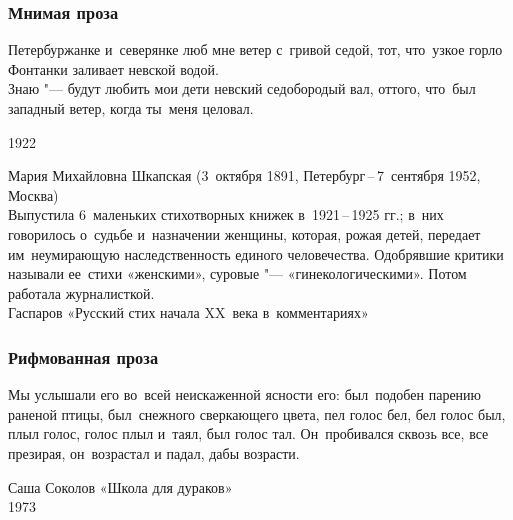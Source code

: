 \documentclass{beamer}
\begin{document}

\begin{frame}
\frametitle{Мнимая проза}
\begin{flushleft}
Петербуржанке и~северянке люб мне ветер с~гривой седой, тот, что~узкое горло Фонтанки заливает невской водой.\\
Знаю "--- будут любить мои дети невский седобородый вал, оттого, что~был западный ветер, когда ты~меня целовал.
\end{flushleft}

1922
\begin{flushleft}
\footnotesize{Мария Михайловна Шкапская
(3~октября 1891, Петербург\,--\,7~сентября 1952, Москва)\\
Выпустила 6~маленьких стихотворных книжек в~1921\,--\,1925 гг.; в~них говорилось о~судьбе и~назначении женщины, которая, рожая детей, передает им~неумирающую наследственность единого человечества. Одобрявшие критики называли ее~стихи «женскими», суровые "--- «гинекологическими». Потом работала журналисткой. \\ 

Гаспаров «Русский стих начала XX~века в~комментариях»}
\end{flushleft}

\end{frame}


\begin{frame}
\frametitle{Рифмованная проза}

\begin{flushleft}
Мы услышали его во~всей неискаженной ясности 
его: был~подобен парению раненой птицы, был~снежного сверкающего цвета, \alert{пел} 
голос \alert{бел}, \alert{бел} голос \alert{был}, \alert{плыл} голос, голос плыл и~\alert{таял}, был голос \alert{тал}. Он~пробивался сквозь все, все презирая, он~возрастал и падал, дабы возрасти.
\end{flushleft}

Саша Соколов «Школа для дураков»\\
1973

\end{frame}

\end{document}
